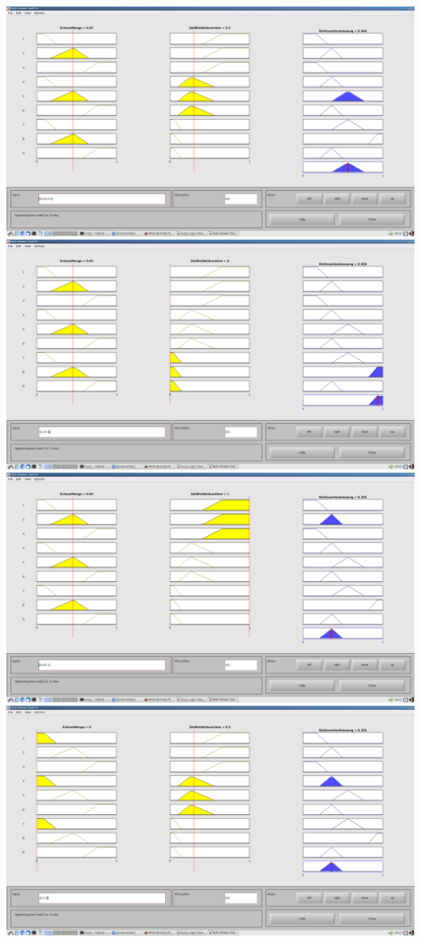 \includegraphics[width=\textwidth]{part/screenshots/fuzzy-17b-0,45-0,3}
\includegraphics[width=\textwidth]{part/screenshots/fuzzy-17b-0,45-0}
\includegraphics[width=\textwidth]{part/screenshots/fuzzy-17b-0,45-1}
\includegraphics[width=\textwidth]{part/screenshots/fuzzy-17b-0-0,3}
